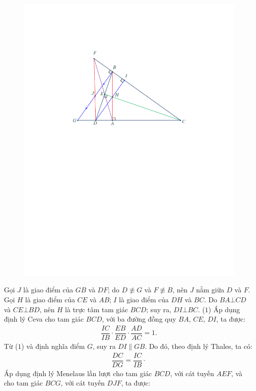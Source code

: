 \begin{multicols}{2}
\begin{figure}[H]
		\includegraphics[width=0.9\linewidth]{P615H1}
		\vspace*{-15pt}
	\end{figure}
	Gọi $J$ là giao điểm của $GB$ và $DF$; do $D \not\equiv G$  và $F \not\equiv B$,  nên $J$ nằm giữa $D$ và $F$.
	\vskip 0.05cm
	Gọi $H$ là giao điểm của $CE$ và $AB$; $I$ là giao điểm của $DH$ và $BC$.
	\vskip 0.05cm
	Do $BA \bot CD$ và $CE \bot BD$, nên $H$ là trực tâm tam giác $BCD$; suy ra, $DI \bot BC$. \hfill                                   ($1$)
	\vskip 0.05cm
	Áp dụng định lý Ceva cho tam giác $BCD$, với ba đường đồng quy $BA$, $CE$, $DI$, ta được:
	\begin{align*}
		\dfrac{{IC}}{{IB}} \cdot \dfrac{{EB}}{{ED}} \cdot \dfrac{{AD}}{{AC}} = 1. \tag{$2$}
	\end{align*}
	Từ ($1$) và định nghĩa điểm $G$, suy ra $DI \parallel GB$. Do đó, theo định lý Thales, ta có:
	\begin{align*}
		\dfrac{{DC}}{{DG}} = \dfrac{{IC}}{{IB}} \cdot \tag{$3$}
	\end{align*}
	Áp dụng định lý Menelaus lần lượt cho tam giác $BCD$, với cát tuyến $AEF$, và cho tam giác $BCG$, với cát tuyến $DJF$, ta được:

\end{multicols}
